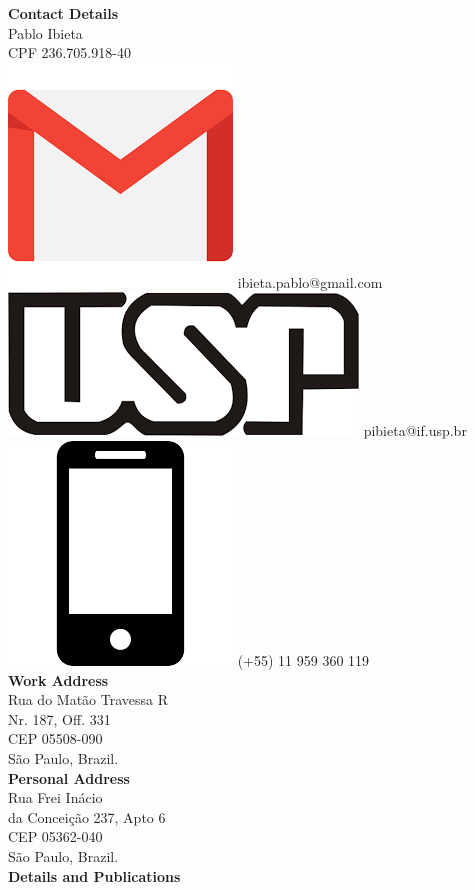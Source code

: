 \documentclass[a4paper,12pt,final]{memoir}
\begin{document}
\begin{flushleft}\small
    \vspace{10mm}
    \textbf{Contact Details}\\
    \vspace{1mm}
	Pablo Ibieta\\
	\vspace{1mm}
	CPF 236.705.918-40 \\
	\vspace{1mm}
    \includegraphics[width=0.07\columnwidth]{gmail_icon.png} ibieta.pablo@gmail.com \\
    \vspace{1mm}
    \includegraphics[width=0.08\columnwidth]{usp_icon.png} pibieta@if.usp.br \\
    \includegraphics[width=0.07\columnwidth]{cellphone_icon.png} (+55) 11 959 360 119 \\	
	\vspace{4mm}
	\textbf{Work Address}\\
	\vspace{1mm}
	Rua do Mat\~ao Travessa R\\
	\vspace{1mm}
	Nr. 187, Off. 331 \\
	\vspace{1mm}
	CEP 05508-090\\
	\vspace{1mm}
	S\~{a}o Paulo, Brazil.\\
	\vspace{4mm}
	\textbf{Personal Address}\\
	\vspace{1mm}
	Rua Frei In\'{a}cio \\
	\vspace{1mm}
	da Conceição 237, Apto 6 \\
	\vspace{1mm}
	CEP 05362-040 \\
	\vspace{1mm}
	S\~{a}o Paulo, Brazil.\\
	\vspace{4mm}
	\textbf{Details and Publications}\\

\end{flushleft}
\end{document}
